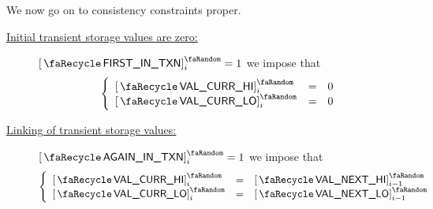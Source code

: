 We now go on to consistency constraints proper.
\begin{description}
	\item[\underline{\underline{Initial transient storage values are zero:}}]
		\If $\transientFirstInTransaction _{i} = 1$ \Then
		we impose that
		\[
			\left\{ \begin{array}{lcl}
				\order{\transCurrValueHi}_{i} & = & 0 \\
				\order{\transCurrValueLo}_{i} & = & 0 \\
			\end{array} \right.
		\]
	\item[\underline{\underline{Linking of transient storage values:}}]
		\If $\transientAgainInTransaction _{i} = 1$ \Then
		we impose that
		\[
			\left\{ \begin{array}{lcl}
				\order{\transCurrValueHi}_{i} & = & \order{\transNextValueHi}_{i - 1} \\
				\order{\transCurrValueLo}_{i} & = & \order{\transNextValueLo}_{i - 1} \\
			\end{array} \right.
		\]
\end{description}
